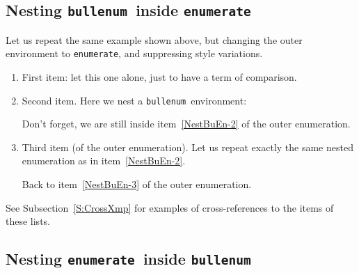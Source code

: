 \documentclass[a4paper]{article}
\DeclareRobustCommand*{\env}[1]{\texttt{#1}}
\newcommand*{\Bullenum}{bullenum}
\newcommand*{\Enumerat}{enumerate}
\newcommand*{\beenv}{\env{\Bullenum}}
\newcommand*{\enenv}{\env{\Enumerat}}
\begin{document}
\subsection{Nesting \beenv\ inside \enenv}
\label{SS:NestBullEnum}

Let us repeat the same example shown above, but changing the outer
environment to \enenv, and suppressing style variations.

\begin{enumerate}
	\item
		First item: let this one alone, just to have a term of
		comparison.

	\item\label{NestBuEn-2}
		Second item.  Here we nest a \beenv\ environment:
		Don't forget, we are still inside item~\ref{NestBuEn-2} of
		the outer enumeration.

	\item\label{NestBuEn-3}
		Third item (of the outer enumeration).  Let us repeat exactly
		the same nested enumeration as in item~\ref{NestBuEn-2}.
		Back to item~\ref{NestBuEn-3} of the outer enumeration.
\end{enumerate}

See Subsection~\ref{S:CrossXmp} for examples of cross-references to
the items of these lists.



\subsection{Nesting \enenv\ inside \beenv}
\label{SS:NestEnumBull}
\end{document}
